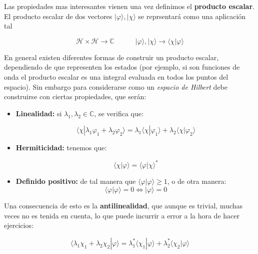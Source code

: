 \documentclass[12pt]{book}
\numberwithin{equation}{chapter}
\numberwithin{figure}{chapter}
\newcommand{\tquad}{\quad \quad \quad}
\begin{document}
Las propiedades mas interesantes vienen una vez definimos el \textbf{producto escalar}. El producto escalar de dos vectores $| \varphi \rangle, | \chi \rangle$ se reprsentará como una aplicación tal

\begin{equation}
\mathcal{H} \times \mathcal{H} \rightarrow \mathbb{C} \tquad  | \varphi \rangle, | \chi \rangle  \rightarrow \langle \chi | \varphi \rangle
\end{equation}

 En general existen diferentes formas de construir un producto escalar, dependiendo de que representen los estados (por ejemplo, si son funciones de onda el producto escalar es una integral evaluada en todos los puntos del espacio). Sin embargo para considerarse como un \textit{espacio de Hilbert} debe construirse con ciertas propiedades, que serán:

\begin{itemize}
\item \textbf{Linealidad:} si $\lambda_1, \lambda_2 \in  \mathbb{C}$, se verifica que:

\begin{equation}
\langle \chi | \lambda_1 \varphi_1 + \lambda_2 \varphi_2 \rangle = \lambda_1 \langle \chi | \varphi_1 \rangle + \lambda_2 \langle \chi | \varphi_2 \rangle
\end{equation}
\item \textbf{Hermiticidad:} tenemos que:

\begin{equation}
\langle \chi | \varphi \rangle = \langle \varphi | \chi \rangle^*
\end{equation}
\item \textbf{Definido positivo:} de tal manera que $\langle \varphi | \varphi \rangle \geq 1$, o de otra manera:
\begin{equation}
\langle \varphi | \varphi \rangle = 0 \Longleftrightarrow | \varphi \rangle = 0
\end{equation}

\end{itemize}

Una consecuencia de esto es la \textbf{antilinealidad}, que aunque es trivial, muchas veces no es tenida en cuenta, lo que puede incurrir a error a la hora de hacer ejercicios:

\begin{equation}
\langle  \lambda_1 \chi_1 + \lambda_2 \chi_2  | \varphi \rangle = \lambda_1^* \langle \chi_1 | \varphi \rangle + \lambda_2^* \langle \chi_2 | \varphi \rangle
\end{equation}
\end{document}
